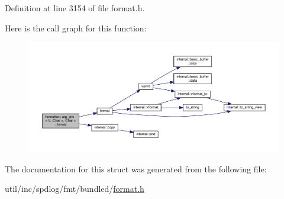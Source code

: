 Definition at line 3154 of file format.\+h.

Here is the call graph for this function\+:
\nopagebreak
\begin{figure}[H]
\begin{center}
\leavevmode
\includegraphics[width=350pt]{structformatter_3_01arg__join_3_01_it_00_01_char_01_4_00_01_char_01_4_ae0c4a217ef67f0a573d1c4fd9bfe0472_cgraph}
\end{center}
\end{figure}


The documentation for this struct was generated from the following file\+:\begin{DoxyCompactItemize}
\item 
util/inc/spdlog/fmt/bundled/\hyperlink{format_8h}{format.\+h}\end{DoxyCompactItemize}
